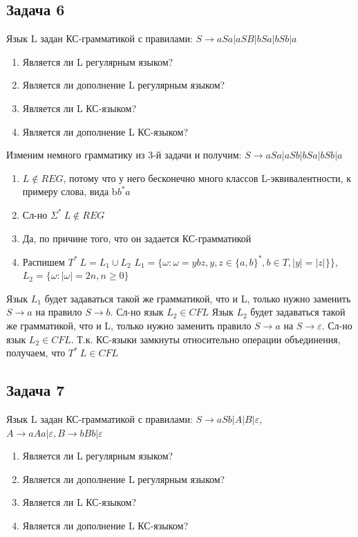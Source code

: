 \documentclass[a4paper,14pt]{article} %
\begin{document}
\subsection{Задача 6}
Язык L задан КС-грамматикой с правилами:
\newline
$S \longrightarrow aSa|aSB|bSa|bSb|a$
\begin{enumerate}
    \item Является ли L регулярным языком?
    \item Является ли дополнение L регулярным языком?
    \item Является ли L КС-языком?
    \item Является ли дополнение L КС-языком?
\end{enumerate}
Изменим немного грамматику из 3-й задачи и получим: $S \longrightarrow aSa|aSb|bSa|bSb|a$
\begin{enumerate}
    \item $L \notin REG$, потому что у него бесконечно много классов L-эквивалентности, к примеру слова, вида b$b^*a$
    \item Сл-но $\Sigma^* \ L \notin REG$
    \item Да, по причине того, что он задается КС-грамматикой
    \item Распишем $T^* \ L = L_1 \cup L_2$
    $L_1 = \{ \omega : \omega = ybz, y, z \in \{a, b\}^*, b \in T, |y| = |z| \}\}$, 
    $L_2 = \{ \omega : |\omega| = 2n, n \geqslant 0\}$
\end{enumerate}
Язык $L_1$ будет задаваться такой же грамматикой, что и L, только нужно заменить $S \longrightarrow a$ на правило $S \longrightarrow b$. Сл-но язык $L_2 \in CFL$ 
\newline
Язык $L_2$ будет задаваться такой же грамматикой, что и L, только нужно заменить правило $S \longrightarrow a$ на $S \longrightarrow \varepsilon$. Сл-но язык $L_2 \in CFL$.
Т.к. КС-языки замкнуты относительно операции объединения, получаем, что $T^* \ L \in CFL$
\subsection{Задача 7}
Язык L задан КС-грамматикой с правилами:
\newline
$S \longrightarrow aSb|A|B|\varepsilon$, $A \longrightarrow aAa|\varepsilon, B \longrightarrow bBb|\varepsilon$
\begin{enumerate}
    \item Является ли L регулярным языком?
    \item Является ли дополнение L регулярным языком?
    \item Является ли L КС-языком?
    \item Является ли дополнение L КС-языком?
\end{enumerate}
\end{document}
